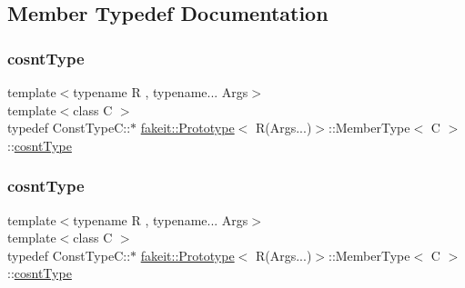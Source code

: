 \subsection{Member Typedef Documentation}
\mbox{\label{structfakeit_1_1Prototype_3_01R_07Args_8_8_8_08_4_1_1MemberType_aeb314b141cc7786abae5c70b3fa35787}} 
\subsubsection{\texorpdfstring{cosntType}{cosntType}\hspace{0.1cm}{\footnotesize\ttfamily [1/9]}}
{\footnotesize\ttfamily template$<$typename R , typename... Args$>$ \\
template$<$class C $>$ \\
typedef Const\+Type\+C\+::$\ast$ \mbox{\hyperlink{structfakeit_1_1Prototype}{fakeit\+::\+Prototype}}$<$ R(Args...)$>$\+::Member\+Type$<$ C $>$\+::\mbox{\hyperlink{structfakeit_1_1Prototype_3_01R_07Args_8_8_8_08_4_1_1MemberType_aeb314b141cc7786abae5c70b3fa35787}{cosnt\+Type}}}

\mbox{\label{structfakeit_1_1Prototype_3_01R_07Args_8_8_8_08_4_1_1MemberType_aeb314b141cc7786abae5c70b3fa35787}} 
\subsubsection{\texorpdfstring{cosntType}{cosntType}\hspace{0.1cm}{\footnotesize\ttfamily [2/9]}}
{\footnotesize\ttfamily template$<$typename R , typename... Args$>$ \\
template$<$class C $>$ \\
typedef Const\+Type\+C\+::$\ast$ \mbox{\hyperlink{structfakeit_1_1Prototype}{fakeit\+::\+Prototype}}$<$ R(Args...)$>$\+::Member\+Type$<$ C $>$\+::\mbox{\hyperlink{structfakeit_1_1Prototype_3_01R_07Args_8_8_8_08_4_1_1MemberType_aeb314b141cc7786abae5c70b3fa35787}{cosnt\+Type}}}


